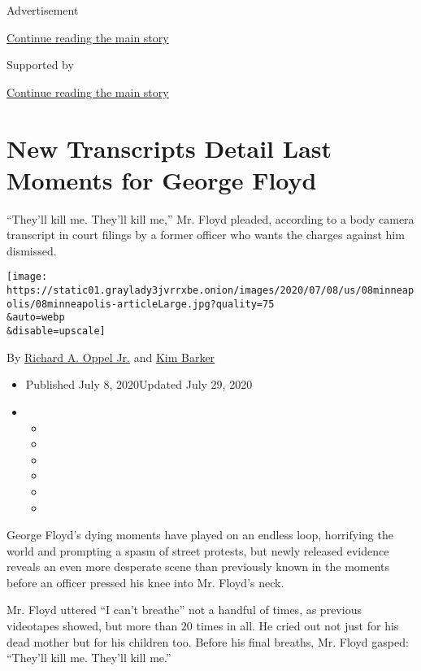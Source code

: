 Advertisement

\protect\hyperlink{after-top}{Continue reading the main story}

Supported by

\protect\hyperlink{after-sponsor}{Continue reading the main story}

\hypertarget{new-transcripts-detail-last-moments-for-george-floyd}{%
\section{New Transcripts Detail Last Moments for George
Floyd}\label{new-transcripts-detail-last-moments-for-george-floyd}}

``They'll kill me. They'll kill me,'' Mr. Floyd pleaded, according to a
body camera transcript in court filings by a former officer who wants
the charges against him dismissed.

\texttt{[image: https://static01.graylady3jvrrxbe.onion/images/2020/07/08/us/08minneapolis/08minneapolis-articleLarge.jpg?quality=75\\\&auto=webp\\\&disable=upscale]}

By
\href{https://www.nytimes3xbfgragh.onion/by/richard-a-oppel-jr}{Richard
A. Oppel Jr.} and
\href{https://www.nytimes3xbfgragh.onion/by/kim-barker}{Kim Barker}

\begin{itemize}
\item
  Published July 8, 2020Updated July 29, 2020
\item
  \begin{itemize}
  \item
  \item
  \item
  \item
  \item
  \item
  \end{itemize}
\end{itemize}

George Floyd's dying moments have played on an endless loop, horrifying
the world and prompting a spasm of street protests, but newly released
evidence reveals an even more desperate scene than previously known in
the moments before an officer pressed his knee into Mr. Floyd's neck.

Mr. Floyd uttered ``I can't breathe'' not a handful of times, as
previous videotapes showed, but more than 20 times in all. He cried out
not just for his dead mother but for his children too. Before his final
breaths, Mr. Floyd gasped: ``They'll kill me. They'll kill me.''

